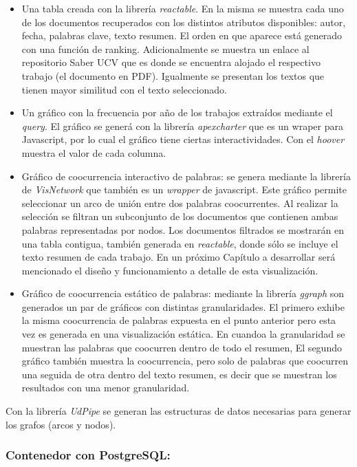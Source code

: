 \documentclass[
  10,
  openany]{book}
\begin{document}
\begin{itemize}
\item
  Una tabla creada con la librería \emph{reactable}. En la misma se muestra cada uno de los documentos recuperados con los distintos atributos disponibles: autor, fecha, palabras clave, texto resumen. El orden en que aparece está generado con una función de ranking. Adicionalmente se muestra un enlace al repositorio Saber UCV que es donde se encuentra alojado el respectivo trabajo (el documento en PDF). Igualmente se presentan los textos que tienen mayor similitud con el texto seleccionado.
\item
  Un gráfico con la frecuencia por año de los trabajos extraídos mediante el \emph{query}. El gráfico se generá con la librería \emph{apexcharter} que es un wraper para Javascript, por lo cual el gráfico tiene ciertas interactividades. Con el \emph{hoover} muestra el valor de cada columna.
\item
  Gráfico de coocurrencia interactivo de palabras: se genera mediante la librería de \emph{VisNetwork} que también es un \emph{wrapper} de javascript. Este gráfico permite seleccionar un arco de unión entre dos palabras coocurrentes. Al realizar la selección se filtran un subconjunto de los documentos que contienen ambas palabras representadas por nodos. Los documentos filtrados se mostrarán en una tabla contigua, también generada en \emph{reactable}, donde sólo se incluye el texto resumen de cada trabajo. En un próximo Capítulo a desarrollar será mencionado el diseño y funcionamiento a detalle de esta visualización.
\item
  Gráfico de coocurrencia estático de palabras: mediante la librería \emph{ggraph} son generados un par de gráficos con distintas granularidades. El primero exhibe la misma coocurrencia de palabras expuesta en el punto anterior pero esta vez es generada en una visualización estática. En cuandoa la granularidad se muestran las palabras que coocurren dentro de todo el resumen, El segundo gráfico también muestra la coocurrencia, pero solo de palabras que coocurren una seguida de otra dentro del texto resumen, es decir que se muestran los resultados con una menor granularidad.
\end{itemize}

Con la librería \emph{UdPipe} se generan las estructuras de datos necesarias para generar los grafos (arcos y nodos).

\hypertarget{conposgres}{%
\subsubsection{Contenedor con PostgreSQL:}\label{conposgres}}
\end{document}
